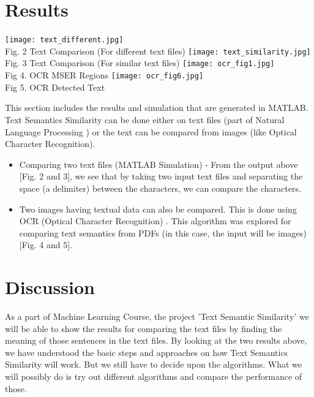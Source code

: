 \documentclass[journal, a4paper]{IEEEtran}
\begin{document}
\section{Results}
\begin{center}
\texttt{[image: text\_different.jpg]} \\
\small Fig. 2 Text Comparison (For different text files)
\texttt{[image: text\_similarity.jpg]} \\
\small Fig. 3 Text Comparison (For similar text files)
\texttt{[image: ocr\_fig1.jpg]} \\
\small Fig 4. OCR  MSER Regions 
\texttt{[image: ocr\_fig6.jpg]} \\
\small Fig 5. OCR Detected Text 
\end{center}
This section includes the results and simulation that are generated in MATLAB. Text Semantics Similarity can be done either on text files (part of Natural Language Processing ) or the text can be compared from images (like Optical Character Recognition).
\begin{itemize}
\item Comparing two text files (MATLAB Simulation) - From the output above [Fig. 2 and 3], we see that by taking two input text files and separating the space (a delimiter) between the characters, we can compare the characters. 
\item Two images having textual data can also be compared. This is done using OCR (Optical Character Recognition) . This algorithm was explored for comparing text semantics from PDFs (in this case, the input will be images) [Fig. 4 and 5]. 
\end{itemize}


\section{Discussion}
As a part of Machine Learning Course, the project 'Text Semantic Similarity' we will be able to show the results for comparing the text files by finding the meaning of those sentences in the text files. 
By looking at the two results above, we have understood the basic steps and approaches on how Text Semantics Similarity will work. But we still have to decide upon the algorithms. What we will possibly do is try out different algorithms and compare the performance of those. 
\end{document}
